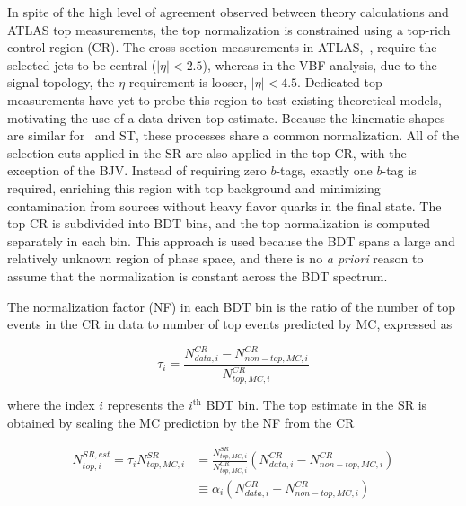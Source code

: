 
In spite of the high level of agreement observed between theory
calculations and ATLAS top measurements, the top normalization is
constrained using a top-rich control region (CR). The cross section
measurements in
ATLAS,~\cite{bib:ttbar_cross_section,bib:Wt_cross_section}, require
the selected jets to be central ($|\eta|<2.5$), whereas in the VBF
analysis, due to the signal topology, the $\eta$ requirement is looser,
$|\eta|<4.5$. Dedicated top measurements have yet to probe this region
to test existing theoretical models, motivating the use of a
data-driven top estimate. Because the kinematic
shapes are similar for \ttbar~and ST, these processes share a common
normalization. All of the selection cuts applied in the SR are also
applied in the top CR, with the exception of the BJV. Instead of
requiring zero $b$-tags, exactly one $b$-tag is required, enriching
this region with top background and minimizing contamination from
sources without heavy flavor quarks in the final state. The top CR is
subdivided into BDT bins, and the top
normalization is computed separately in each bin. This approach is
used because the BDT spans a large and relatively unknown region of
phase space, and there is no \textit{a priori} reason to assume that the
normalization is constant across the BDT spectrum. 

The normalization factor (NF) in each BDT bin is the ratio of the number of
top events in the CR in data to number of top events
predicted by MC, expressed as

\begin{equation}
\label{chap:analysis:equation:top_nf}
\tau_i = \frac{N_{data,i}^{CR} - N_{non-top,MC,i}^{CR}}{N_{top,MC,i}^{CR}}
\end{equation}

\noindent where the index $i$ represents the $i^{\textrm{th}}$ BDT bin. The top estimate in the SR is obtained by scaling the MC
prediction by the NF from the CR

\begin{equation}
\begin{aligned}
\label{chap:analysis:equation:top_est}
N_{top,i}^{SR,est} = \tau_i N_{top,MC,i}^{SR}
& = \frac{N_{top,MC,i}^{SR}}{N_{top,MC,i}^{CR}}(N_{data,i}^{CR} -
N_{non-top,MC,i}^{CR}) \\
& \equiv \alpha_i (N_{data,i}^{CR} - N_{non-top,MC,i}^{CR})
\end{aligned}
\end{equation}

